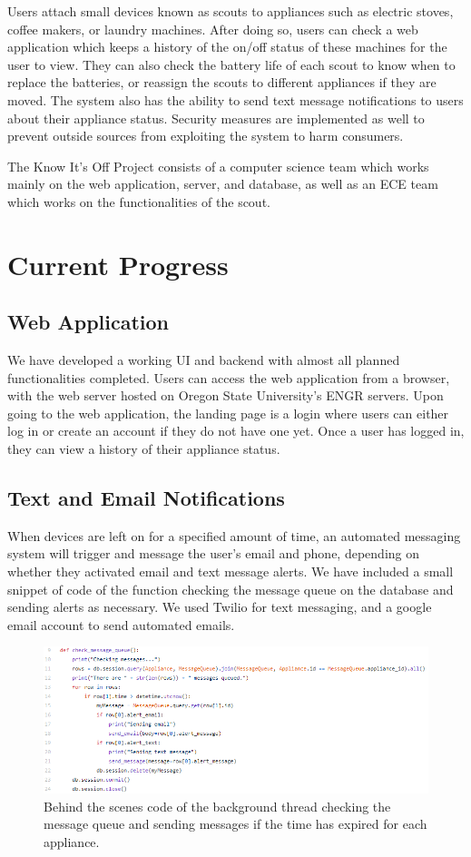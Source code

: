 \documentclass[onecolumn, draftclsnofoot,10pt, compsoc]{IEEEtran}
\begin{document}
Users attach small devices known as scouts to appliances such as electric stoves, coffee makers, or laundry machines. After doing so, users can check a web application which keeps a history of the on/off status of these machines for the user to view. They can also check the battery life of each scout to know when to replace the batteries, or reassign the scouts to different appliances if they are moved. The system also has the ability to send text message notifications to users about their appliance status. Security measures are implemented as well to prevent outside sources from exploiting the system to harm consumers. 

The Know It's Off Project consists of a computer science team which works mainly on the web application, server, and database, as well as an ECE team which works on the functionalities of the scout. 

\section{Current Progress}

\subsection{Web Application}
We have developed a working UI and backend with almost all planned functionalities completed. Users can access the web application from a browser, with the web server hosted on Oregon State University's ENGR servers. Upon going to the web application, the landing page is a login where users can either log in or create an account if they do not have one yet. Once a user has logged in, they can view a history of their appliance status.  

\subsection{Text and Email Notifications}
When devices are left on for a specified amount of time, an automated messaging system will trigger and message the user's email and phone, depending on whether they activated email and text message alerts. We have included a small snippet of code of the function checking the message queue on the database and sending alerts as necessary. We used Twilio for text messaging, and a google email account to send automated emails.

\begin{figure}
    \centering
    \includegraphics[width = \textwidth]{message.PNG}
    \caption{Behind the scenes code of the background thread checking the message queue and sending messages if the time has expired for each appliance.}
\end{figure}
\end{document}
